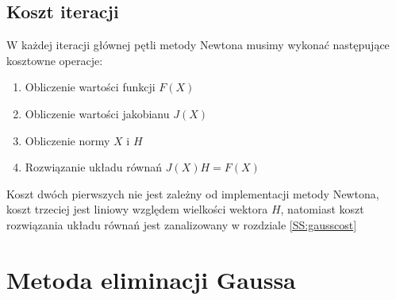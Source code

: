 \documentclass[11pt,wide]{mwart}
\begin{document}
\subsection{Koszt iteracji}
W każdej iteracji głównej pętli metody Newtona musimy wykonać następujące kosztowne operacje:
\begin{enumerate}
\item Obliczenie wartości funkcji $ F(X) $
\item Obliczenie wartości jakobianu $ J(X) $
\item Obliczenie normy $ X $ i $ H $
\item Rozwiązanie układu równań $ J(X)H = F(X)$
\end{enumerate}
Koszt dwóch pierwszych nie jest zależny od implementacji metody Newtona, koszt trzeciej jest liniowy względem wielkości wektora $ H $, natomiast koszt rozwiązania układu równań jest zanalizowany w rozdziale \ref{SS:gausscost}
\section{Metoda eliminacji Gaussa}
\end{document}
